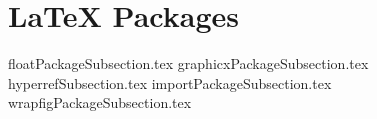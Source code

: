 \documentclass[class=book , crop=false]{standalone}
\title{}  %
\begin{document}
\section{\LaTeX{} Packages}

{floatPackageSubsection.tex}
{graphicxPackageSubsection.tex}
{hyperrefSubsection.tex}
{importPackageSubsection.tex}
{wrapfigPackageSubsection.tex}
\end{document}
